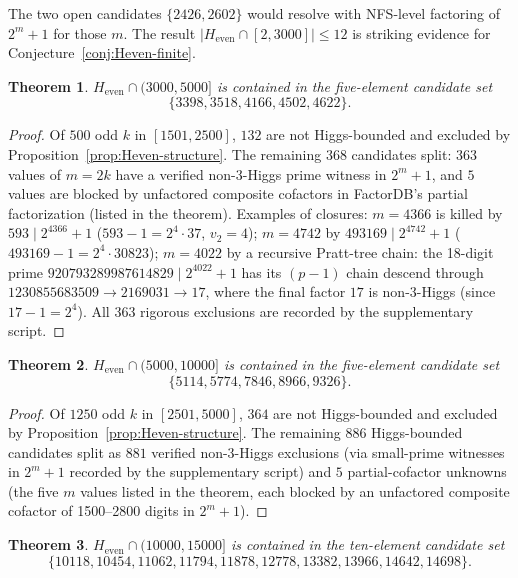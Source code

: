 \documentclass[11pt]{amsart}
\theoremstyle{plain}
\newtheorem{theorem}{Theorem}
\theoremstyle{definition}
\begin{document}
\noindent The two open candidates $\{2426, 2602\}$ would
resolve with NFS-level factoring of $2^m + 1$ for those $m$. The
result $|H_{\mathrm{even}} \cap [2, 3000]| \le 12$ is striking
evidence for Conjecture~\ref{conj:Heven-finite}.

\begin{theorem}\label{thm:Heven-5000}
$H_{\mathrm{even}} \cap (3000, 5000]$ is contained in the five-element
candidate set
\[
\{3398, 3518, 4166, 4502, 4622\}.
\]
\end{theorem}

\begin{proof}
Of $500$ odd $k$ in $[1501, 2500]$, $132$ are not Higgs-bounded and
excluded by Proposition~\ref{prop:Heven-structure}. The remaining
$368$ candidates split: $363$ values of $m = 2k$ have a verified
non-3-Higgs prime witness in $2^m + 1$, and $5$ values are blocked by
unfactored composite cofactors in FactorDB's partial factorization
(listed in the theorem). Examples of closures: $m = 4366$ is killed
by $593 \mid 2^{4366}+1$ ($593 - 1 = 2^4 \cdot 37$, $v_2 = 4$);
$m = 4742$ by $493169 \mid 2^{4742}+1$
($493169 - 1 = 2^4 \cdot 30823$); $m = 4022$ by a recursive Pratt-tree
chain: the 18-digit prime
$920793289987614829 \mid 2^{4022}+1$ has its $(p-1)$ chain descend
through $1230855683509 \to 2169031 \to 17$, where the final factor
$17$ is non-3-Higgs (since $17-1 = 2^4$). All $363$ rigorous exclusions
are recorded by the supplementary script.
\end{proof}

\begin{theorem}\label{thm:Heven-10000}
$H_{\mathrm{even}} \cap (5000, 10000]$ is contained in the
five-element candidate set
\[
\{5114, 5774, 7846, 8966, 9326\}.
\]
\end{theorem}

\begin{proof}
Of $1250$ odd $k$ in $[2501, 5000]$, $364$ are not Higgs-bounded
and excluded by Proposition~\ref{prop:Heven-structure}. The remaining
$886$ Higgs-bounded candidates split as $881$ verified non-3-Higgs
exclusions (via small-prime witnesses in $2^m + 1$ recorded by the
supplementary script) and $5$ partial-cofactor unknowns (the five $m$
values listed in the theorem, each blocked by an unfactored composite
cofactor of 1500--2800 digits in $2^m+1$).
\end{proof}

\begin{theorem}\label{thm:Heven-15000}
$H_{\mathrm{even}} \cap (10000, 15000]$ is contained in the
ten-element candidate set
\[
\{10118, 10454, 11062, 11794, 11878, 12778, 13382, 13966, 14642, 14698\}.
\]
\end{theorem}
\end{document}
